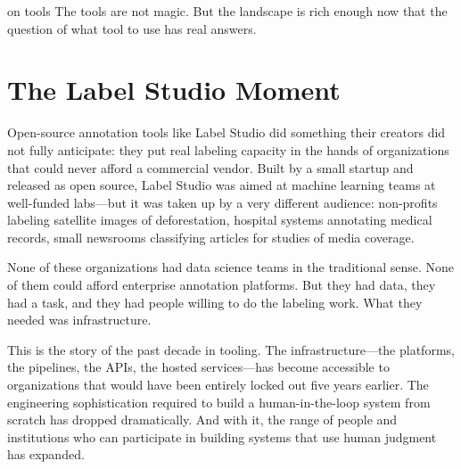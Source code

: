 
\label{chap:ch09}
\begin{chapterquote}{on tools}
The tools are not magic. But the landscape is rich enough now that the question of what tool to use has real answers.
\end{chapterquote}

\section{The Label Studio Moment}
\label{sec:ch09-label-studio-moment}

Open-source annotation tools like Label Studio did something their creators did not fully anticipate: they put real labeling capacity in the hands of organizations that could never afford a commercial vendor. Built by a small startup and released as open source, Label Studio was aimed at machine learning teams at well-funded labs---but it was taken up by a very different audience: non-profits labeling satellite images of deforestation, hospital systems annotating medical records, small newsrooms classifying articles for studies of media coverage.

None of these organizations had data science teams in the traditional sense. None of them could afford enterprise annotation platforms. But they had data, they had a task, and they had people willing to do the labeling work. What they needed was infrastructure.

This is the story of the past decade in \hitl tooling. The infrastructure---the platforms, the pipelines, the APIs, the hosted services---has become accessible to organizations that would have been entirely locked out five years earlier. The engineering sophistication required to build a human-in-the-loop system from scratch has dropped dramatically. And with it, the range of people and institutions who can participate in building \ai systems that use human judgment has expanded.

